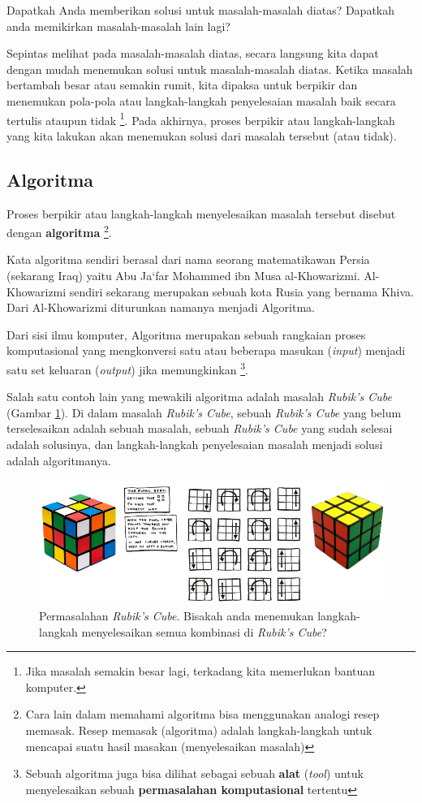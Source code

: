 Dapatkah Anda memberikan solusi untuk masalah-masalah diatas? Dapatkah anda memikirkan masalah-masalah lain lagi? 

Sepintas melihat pada masalah-masalah diatas, secara langsung kita dapat dengan mudah menemukan solusi untuk masalah-masalah diatas. Ketika masalah bertambah besar atau semakin rumit, kita dipaksa untuk berpikir dan menemukan pola-pola atau langkah-langkah penyelesaian masalah baik secara tertulis ataupun tidak \footnote{Jika masalah semakin besar lagi, terkadang kita memerlukan bantuan komputer.}. Pada akhirnya, proses berpikir atau langkah-langkah yang kita lakukan akan menemukan solusi dari masalah tersebut (atau tidak). 

\subsection{Algoritma}
Proses berpikir atau langkah-langkah menyelesaikan masalah tersebut disebut dengan \textbf{algoritma} \footnote{Cara lain dalam memahami algoritma bisa menggunakan analogi resep memasak. Resep memasak (algoritma) adalah langkah-langkah untuk mencapai suatu hasil masakan (menyelesaikan masalah)}. 

Kata algoritma sendiri berasal dari nama seorang matematikawan Persia (sekarang Iraq) yaitu Abu Ja`far Mohammed ibn Musa al-Khowarizmi. Al-Khowarizmi sendiri sekarang merupakan sebuah kota Rusia yang bernama Khiva. Dari Al-Khowarizmi diturunkan namanya menjadi Algoritma. 

Dari sisi ilmu komputer, Algoritma merupakan sebuah rangkaian proses komputasional yang mengkonversi satu atau beberapa masukan (\textit{input}) menjadi satu set keluaran (\textit{output}) jika memungkinkan \footnote{Sebuah algoritma juga bisa dilihat sebagai sebuah \textbf{alat} (\textit{tool}) untuk menyelesaikan sebuah \textbf{permasalahan komputasional} tertentu}.

Salah satu contoh lain yang mewakili algoritma adalah masalah \textit{Rubik's Cube} (Gambar \ref{fig:RubikCube}). Di dalam masalah \textit{Rubik's Cube}, sebuah \textit{Rubik's Cube} yang belum terselesaikan adalah sebuah masalah, sebuah \textit{Rubik's Cube} yang sudah selesai adalah solusinya, dan langkah-langkah penyelesaian masalah menjadi solusi adalah algoritmanya. 

\begin{figure}
	\includegraphics[scale=0.7]{fig/1/Gambar8.png}
	\caption{Permasalahan \textit{Rubik's Cube}. Bisakah anda menemukan langkah-langkah menyelesaikan semua kombinasi di \textit{Rubik's Cube}?}
	\label{fig:RubikCube}
\end{figure}


